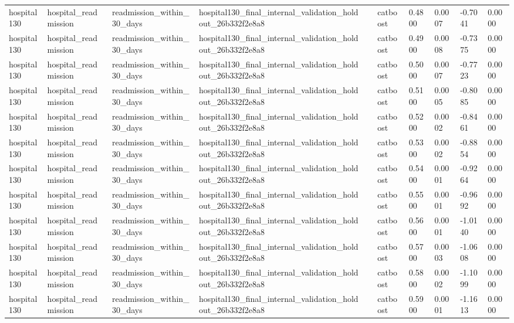 \begin{tabular}{llllllllll}
hospital130 & hospital\_readmission & readmission\_within\_30\_days & hospital130\_final\_internal\_validation\_holdout\_26b332f2e8a8 &  & catboost & 0.4800 & 0.0007 & -0.7041 & 0.0000 \\
hospital130 & hospital\_readmission & readmission\_within\_30\_days & hospital130\_final\_internal\_validation\_holdout\_26b332f2e8a8 &  & catboost & 0.4900 & 0.0008 & -0.7375 & 0.0000 \\
hospital130 & hospital\_readmission & readmission\_within\_30\_days & hospital130\_final\_internal\_validation\_holdout\_26b332f2e8a8 &  & catboost & 0.5000 & 0.0007 & -0.7723 & 0.0000 \\
hospital130 & hospital\_readmission & readmission\_within\_30\_days & hospital130\_final\_internal\_validation\_holdout\_26b332f2e8a8 &  & catboost & 0.5100 & 0.0005 & -0.8085 & 0.0000 \\
hospital130 & hospital\_readmission & readmission\_within\_30\_days & hospital130\_final\_internal\_validation\_holdout\_26b332f2e8a8 &  & catboost & 0.5200 & 0.0002 & -0.8461 & 0.0000 \\
hospital130 & hospital\_readmission & readmission\_within\_30\_days & hospital130\_final\_internal\_validation\_holdout\_26b332f2e8a8 &  & catboost & 0.5300 & 0.0002 & -0.8854 & 0.0000 \\
hospital130 & hospital\_readmission & readmission\_within\_30\_days & hospital130\_final\_internal\_validation\_holdout\_26b332f2e8a8 &  & catboost & 0.5400 & 0.0001 & -0.9264 & 0.0000 \\
hospital130 & hospital\_readmission & readmission\_within\_30\_days & hospital130\_final\_internal\_validation\_holdout\_26b332f2e8a8 &  & catboost & 0.5500 & 0.0001 & -0.9692 & 0.0000 \\
hospital130 & hospital\_readmission & readmission\_within\_30\_days & hospital130\_final\_internal\_validation\_holdout\_26b332f2e8a8 &  & catboost & 0.5600 & 0.0001 & -1.0140 & 0.0000 \\
hospital130 & hospital\_readmission & readmission\_within\_30\_days & hospital130\_final\_internal\_validation\_holdout\_26b332f2e8a8 &  & catboost & 0.5700 & 0.0003 & -1.0608 & 0.0000 \\
hospital130 & hospital\_readmission & readmission\_within\_30\_days & hospital130\_final\_internal\_validation\_holdout\_26b332f2e8a8 &  & catboost & 0.5800 & 0.0002 & -1.1099 & 0.0000 \\
hospital130 & hospital\_readmission & readmission\_within\_30\_days & hospital130\_final\_internal\_validation\_holdout\_26b332f2e8a8 &  & catboost & 0.5900 & 0.0001 & -1.1613 & 0.0000 \\

\end{tabular}
